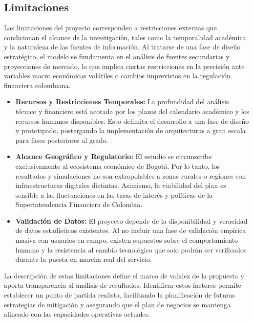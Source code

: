 {}
\subsection*{Limitaciones}

Las limitaciones del proyecto corresponden a restricciones externas que condicionan el alcance de la investigación, tales como la temporalidad académica y la naturaleza de las fuentes de información. Al tratarse de una fase de diseño estratégico, el modelo se fundamenta en el análisis de fuentes secundarias y proyecciones de mercado, lo que implica ciertas restricciones en la precisión ante variables macro económicas volátiles o cambios imprevistos en la regulación financiera colombiana.

\begin{itemize}
	\item \textbf{Recursos y Restricciones Temporales:} La profundidad del análisis técnico y financiero está acotada por los plazos del calendario académico y los recursos humanos disponibles. Esto delimita el desarrollo a una fase de diseño y prototipado, postergando la implementación de arquitecturas a gran escala para fases posteriores al grado.
	
	\item \textbf{Alcance Geográfico y Regulatorio:} El estudio se circunscribe exclusivamente al ecosistema económico de Bogotá. Por lo tanto, los resultados y simulaciones no son extrapolables a zonas rurales o regiones con infraestructuras digitales distintas. Asimismo, la viabilidad del plan es sensible a las fluctuaciones en las tasas de interés y políticas de la Superintendencia Financiera de Colombia.
	
	\item \textbf{Validación de Datos:} El proyecto depende de la disponibilidad y veracidad de datos estadísticos existentes. Al no incluir una fase de validación empírica masiva con usuarios en campo, existen supuestos sobre el comportamiento humano y la resistencia al cambio tecnológico que solo podrán ser verificados durante la puesta en marcha real del servicio.
\end{itemize}

La descripción de estas limitaciones define el marco de validez de la propuesta y aporta transparencia al análisis de resultados. Identificar estos factores permite establecer un punto de partida realista, facilitando la planificación de futuras estrategias de mitigación y asegurando que el plan de negocios se mantenga alineado con las capacidades operativas actuales.
